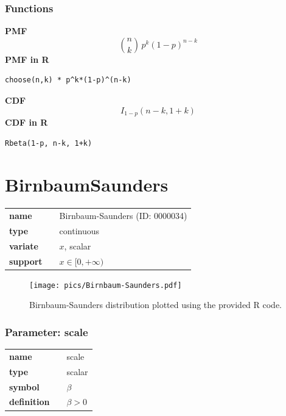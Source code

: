 \documentclass{article}
\begin{document}
\subsubsection*{Functions}

\smallskip \noindent \hspace{.2cm} \textbf{PMF} 
\begin{equation*}{n \choose k}\, p^k (1-p)^{n-k}\end{equation*}
\smallskip \noindent \hspace{.2cm} \textbf{PMF in R}  
\begin{verbatim}choose(n,k) * p^k*(1-p)^(n-k)\end{verbatim}
\smallskip \noindent \hspace{.2cm} \textbf{CDF} 
\begin{equation*}I_{1-p}(n - k, 1 + k)\end{equation*}
\smallskip \noindent \hspace{.2cm} \textbf{CDF in R} 
\begin{verbatim}Rbeta(1-p, n-k, 1+k)\end{verbatim}
\smallskip\section*{BirnbaumSaunders} 

  \bigskip 

\begin{tabular}{p{2cm}cl}
\textbf{name} & & Birnbaum-Saunders (ID: 0000034)\\ 
 
\textbf{type} & & continuous \\ 

\textbf{variate} & & $x$, scalar \\ 

\textbf{support} & & $x \in [0,+\infty)$
\end{tabular}

\begin{figure}[ht!]
\centering
  \texttt{[image: pics/Birnbaum-Saunders.pdf]}
 \caption{Birnbaum-Saunders distribution plotted using the provided R code.}
 \label{fig:Birnbaum-Saunders}
\end{figure}

\subsubsection*{Parameter: scale}

\noindent\begin{tabular}{p{2cm}cl}
\textbf{name} & & scale \\
\textbf{type} & & scalar \\
\textbf{symbol} & & $\beta$  \\
\textbf{definition} & & $\beta > 0$
\end{tabular}
\end{document}
